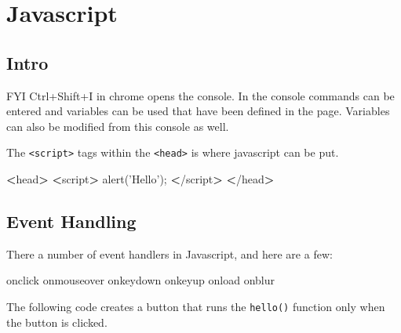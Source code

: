 \documentclass[]{book}
\newenvironment{Shaded}{\begin{snugshade}}{\end{snugshade}}
\newcommand{\ExtensionTok}[1]{#1}
\newcommand{\FunctionTok}[1]{\textcolor[rgb]{0.00,0.00,0.00}{#1}}
\newcommand{\NormalTok}[1]{#1}
\newcommand{\OperatorTok}[1]{\textcolor[rgb]{0.81,0.36,0.00}{\textbf{#1}}}
\newcommand{\StringTok}[1]{\textcolor[rgb]{0.31,0.60,0.02}{#1}}
\begin{document}
\hypertarget{javascript}{%
\chapter{Javascript}\label{javascript}}

\hypertarget{intro-3}{%
\section{Intro}\label{intro-3}}

FYI Ctrl+Shift+I in chrome opens the console. In the console commands can be entered and variables can be used that have been defined in the page. Variables can also be modified from this console as well.

The \texttt{\textless{}script\textgreater{}} tags within the \texttt{\textless{}head\textgreater{}} is where javascript can be put.

\begin{Shaded}
\begin{Highlighting}[]
\OperatorTok{<}\FunctionTok{head}\OperatorTok{>}
    \OperatorTok{<}\ExtensionTok{script}\OperatorTok{>}
        \ExtensionTok{alert}\NormalTok{(}\StringTok{'Hello'}\NormalTok{);}
    \OperatorTok{<}\NormalTok{/}\ExtensionTok{script}\OperatorTok{>}
\OperatorTok{<}\NormalTok{/}\ExtensionTok{head}\OperatorTok{>}
\end{Highlighting}
\end{Shaded}

\hypertarget{event-handling}{%
\section{Event Handling}\label{event-handling}}

There a number of event handlers in Javascript, and here are a few:

\begin{Shaded}
\begin{Highlighting}[]
\ExtensionTok{onclick}
\ExtensionTok{onmouseover}
\ExtensionTok{onkeydown}
\ExtensionTok{onkeyup}
\ExtensionTok{onload}
\ExtensionTok{onblur}
\end{Highlighting}
\end{Shaded}

The following code creates a button that runs the \texttt{hello()} function only when the button is clicked.
\end{document}
